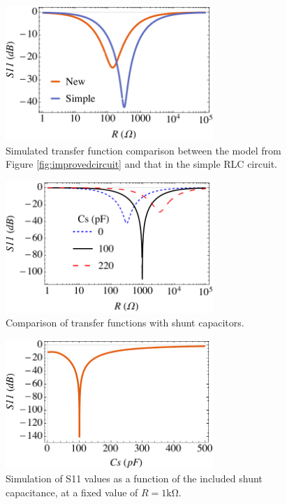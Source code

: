 \documentclass{article}
\begin{document}
\begin{figure}[H]
    \centering
    \includegraphics[width = 0.7\textwidth]{transfer_improved.pdf}
    \caption{Simulated transfer function comparison between the model from Figure \ref{fig:improvedcircuit} and that in the simple RLC circuit.}
    \label{fig:improvedtransfer}
\end{figure}

\begin{figure}[H]
    \centering
    \includegraphics[width=0.7\textwidth]{cs_comparison.pdf}
    \caption{Comparison of transfer functions with shunt capacitors.}
    \label{fig:cscomparison}
\end{figure}

\begin{figure}[H]
    \centering
    \includegraphics[width = 0.7\textwidth]{cs_simulation.pdf}
    \caption{Simulation of S11 values as a function of the included shunt capacitance, at a fixed value of $R = 1\si{\kilo\ohm}$.}
    \label{fig:cssimulation}
\end{figure}
\end{document}

